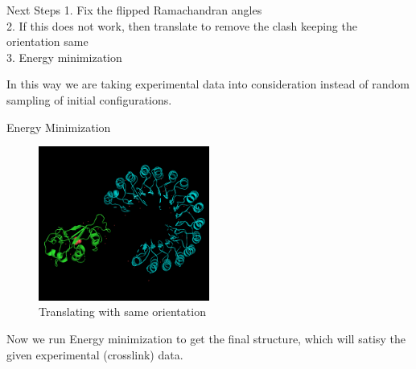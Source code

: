 \begin{frame}{Next Steps}
    1. Fix the flipped Ramachandran angles \\
    2. If this does not work, then translate to remove the clash keeping the orientation same \\
    3. Energy minimization \\

    \bigskip

    In this way we are taking experimental data into consideration instead of random sampling of initial configurations.
\end{frame}

\begin{frame}{Energy Minimization}
    \begin{figure}
        \centering
        \includegraphics[width=0.5\textwidth]{images/1dfj_4.png}
        \caption{Translating with same orientation}
        \label{fig:my_label}
    \end{figure}

    Now we run Energy minimization to get the final structure, which will satisy the given experimental (crosslink) data.
\end{frame}